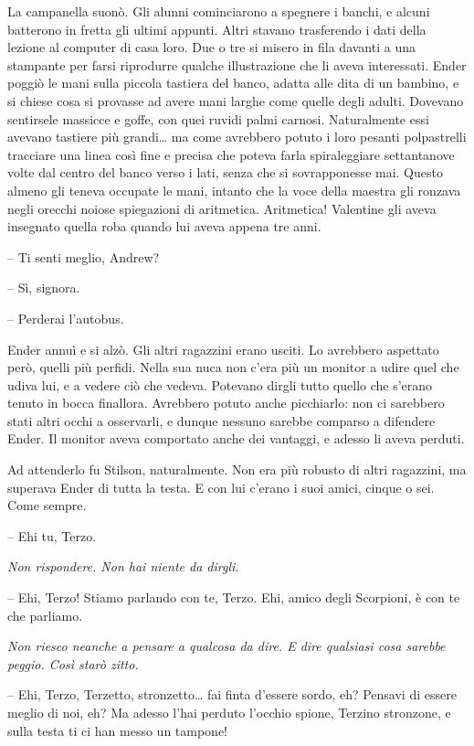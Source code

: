 {La campanella suonò. Gli alunni cominciarono a spegnere i banchi, e
	alcuni batterono in fretta gli ultimi appunti. Altri stavano trasferendo
	i dati della lezione al computer di casa loro. Due o tre si misero in
	fila davanti a una stampante per farsi riprodurre qualche illustrazione
	che li aveva interessati. Ender poggiò le mani sulla piccola tastiera
	del banco, adatta alle dita di un bambino, e si chiese cosa si provasse
	ad avere mani larghe come quelle degli adulti. Dovevano sentirsele
	massicce e goffe, con quei ruvidi palmi carnosi. Naturalmente essi
	avevano tastiere più grandi\ldots{} ma come avrebbero potuto i loro
	pesanti polpastrelli tracciare una linea così fine e precisa che poteva
	farla spiraleggiare settantanove volte dal centro del banco verso i
	lati, senza che si sovrapponesse mai. Questo almeno gli teneva occupate
	le mani, intanto che la voce della maestra gli ronzava negli orecchi
	noiose spiegazioni di aritmetica. Aritmetica! Valentine gli aveva
	insegnato quella roba quando lui aveva appena tre anni.}

{-- Ti senti meglio, Andrew?}

{-- Sì, signora.}

{-- Perderai l'autobus.}

{Ender annuì e si alzò. Gli altri ragazzini erano usciti. Lo avrebbero
	aspettato però, quelli più perfidi. Nella sua nuca non c'era più un
	monitor a udire quel che udiva lui, e a vedere ciò che vedeva. Potevano
	dirgli tutto quello che s'erano tenuto in bocca finallora. Avrebbero
	potuto anche picchiarlo: non ci sarebbero stati altri occhi a
	osservarli, e dunque nessuno sarebbe comparso a difendere Ender. Il
	monitor aveva comportato anche dei vantaggi, e adesso li aveva perduti.}

{Ad attenderlo fu Stilson, naturalmente. Non era più robusto di altri
	ragazzini, ma superava Ender di tutta la testa. E con lui c'erano i suoi
	amici, cinque o sei. Come sempre.}

{-- Ehi tu, Terzo.}

\emph{{Non rispondere. Non hai niente da dirgli.}}

{-- Ehi, Terzo! Stiamo parlando con te, Terzo. Ehi, amico degli
	Scorpioni, è con te che parliamo.}

\emph{{Non riesco neanche a pensare a qualcosa da dire. E dire qualsiasi
		cosa sarebbe peggio. Così starò zitto.}}

{-- Ehi, Terzo, Terzetto, stronzetto\ldots{} fai finta d'essere sordo,
	eh? Pensavi di essere meglio di noi, eh? Ma adesso l'hai perduto
	l'occhio spione, Terzino stronzone, e sulla testa ti ci han messo un
	tampone!}

